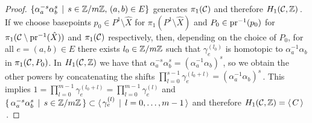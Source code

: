 \documentclass[main.tex]{subfiles}
\begin{document}
\begin{proof}
  $\{ \alpha_a^{-s} \alpha_b^{s} \, \mid \, s \in \mathbb{Z}/m\mathbb{Z}, \, (a,b) \in E \}$ generates $\pi_1(\mathcal{C})$ and therefore $H_1(\mathcal{C},\mathbb{Z})$\,. \abstand
  If we choose basepoints $p_0 \in P^1 \setminus \hat{X}$ for $\pi_1(P^1 \setminus \hat{X})$ and $P_0 \in \operatorname{pr}^{-1}(p_0)$ for $\pi_1(\mathcal{C} \setminus \operatorname{pr}^{-1}(\hat{X}))$ and $\pi_1(\mathcal{C})$ respectively, then,
  depending on the choice of $P_0$, for all $e = (a,b) \in E$ there exists $l_0 \in \mathbb{Z}/m\mathbb{Z}$ such that $\gamma_e^{(l_0)}$ is homotopic to $\alpha_a^{-1} \alpha_b$ in $\pi_1(\mathcal{C},P_0)$. 
   In $H_1(\mathcal{C},\mathbb{Z})$ we have that $\alpha_a^{-s}\alpha_b^{s} = ( \alpha_a^{-1}\alpha_b)^s$, so we obtain the other powers by concatenating
  the shifts $\prod_{l = 0}^{s-1} \gamma_e^{(l_0+l)} = (\alpha_a^{-1}\alpha_b)^s$\,.
  This implies $1 = \prod_{l = 0}^{m-1} \gamma_e^{(l_0+l)} = \prod_{l = 0}^{m-1} \gamma_e^{(l)}$ and 
   $\{ \, \alpha_a^{-s} \alpha_b^{s} \, \mid \, s \in \mathbb{Z}/m\mathbb{Z} \, \} \subset  \langle \, \gamma_e^{(l)} \,
  \mid \, l = 0,\dots,m-1 \,\rangle$ and therefore $H_1(\mathcal{C},\mathbb{Z}) = \langle \, C \, \rangle$\,.
  
  \end{proof}
\end{document}
